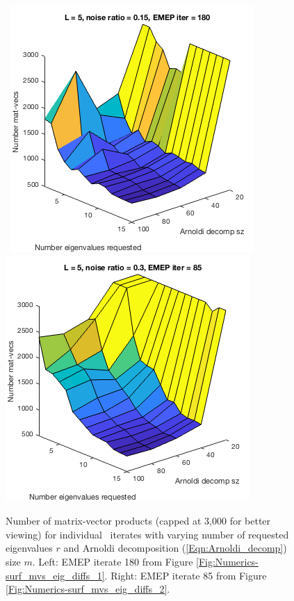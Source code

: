\begin{figure}[H]
\centering
\hbox{\hspace{0.3cm} 
	\includegraphics[scale=0.6]{Numerics-surf_mvs_for_m_vs_j_1}
	\hspace{0.5cm}
	\includegraphics[scale=0.6]{Numerics-surf_mvs_for_m_vs_j_2} 
			}
	\vspace{0.0cm}
	\caption{
Number of matrix-vector products (capped at 3,000 for better viewing) for individual \emep \ iterates with varying number of requested eigenvalues $r$ and Arnoldi decomposition (\ref{Eqn:Arnoldi_decomp}) size $m$.  
Left: EMEP iterate 180 from Figure \ref{Fig:Numerics-surf_mvs_eig_diffs_1}.
Right: EMEP iterate 85 from Figure \ref{Fig:Numerics-surf_mvs_eig_diffs_2}.
	}
\label{Fig:Numerics-surf_mvs_for_m_vs_j}
\end{figure}




